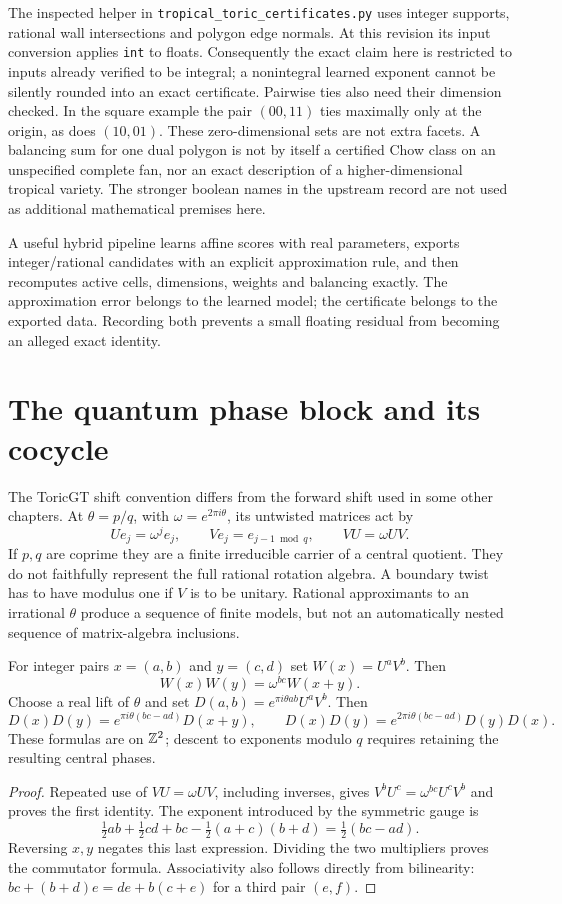 The inspected helper in \texttt{tropical\_toric\_certificates.py} uses
integer supports, rational wall intersections and polygon edge normals.
At this revision its input conversion applies \texttt{int} to floats.
Consequently the exact claim here is restricted to inputs already
verified to be integral; a nonintegral learned exponent cannot be silently
rounded into an exact certificate. Pairwise ties also need their dimension
checked. In the square example the pair $(00,11)$ ties maximally only at
the origin, as does $(10,01)$. These zero-dimensional sets are not extra
facets. A balancing sum for one dual polygon is not by itself a certified
Chow class on an unspecified complete fan, nor an exact description of a
higher-dimensional tropical variety. The stronger boolean names in the
upstream record are not used as additional mathematical premises here.

A useful hybrid pipeline learns affine scores with real parameters,
exports integer/rational candidates with an explicit approximation rule,
and then recomputes active cells, dimensions, weights and balancing
exactly. The approximation error belongs to the learned model; the
certificate belongs to the exported data. Recording both prevents a
small floating residual from becoming an alleged exact identity.

\section{The quantum phase block and its cocycle}
The ToricGT shift convention differs from the forward shift used in some
other chapters. At $\theta=p/q$, with $\omega=e^{2\pi i\theta}$, its
untwisted matrices act by
\[
 Ue_j=\omega^je_j,\qquad Ve_j=e_{j-1\bmod q},\qquad
 VU=\omega UV.
\]
If $p,q$ are coprime they are a finite irreducible carrier of a central
quotient. They do not faithfully represent the full rational rotation
algebra. A boundary twist has to have modulus one if $V$ is to be
unitary. Rational approximants to an irrational $\theta$ produce a
sequence of finite models, but not an automatically nested sequence of
matrix-algebra inclusions.

\begin{proposition}\label{tg:cocycle}
For integer pairs $x=(a,b)$ and $y=(c,d)$ set
$W(x)=U^aV^b$. Then
\[
 W(x)W(y)=\omega^{bc}W(x+y).
\]
Choose a real lift of $\theta$ and set
$D(a,b)=e^{\pi i\theta ab}U^aV^b$. Then
\[
 D(x)D(y)=e^{\pi i\theta(bc-ad)}D(x+y),\qquad
 D(x)D(y)=e^{2\pi i\theta(bc-ad)}D(y)D(x).
\]
These formulas are on $\mathbb Z^2$; descent to exponents modulo $q$ requires
retaining the resulting central phases.
\end{proposition}
\begin{proof}
Repeated use of $VU=\omega UV$, including inverses, gives
$V^bU^c=\omega^{bc}U^cV^b$ and proves the first identity.
The exponent introduced by the symmetric gauge is
\[
 \tfrac12ab+\tfrac12cd+bc-\tfrac12(a+c)(b+d)
 =\tfrac12(bc-ad).
\]
Reversing $x,y$ negates this last expression. Dividing the two multipliers
proves the commutator formula. Associativity also follows directly from
bilinearity: $bc+(b+d)e=de+b(c+e)$ for a third pair $(e,f)$.
\end{proof}


